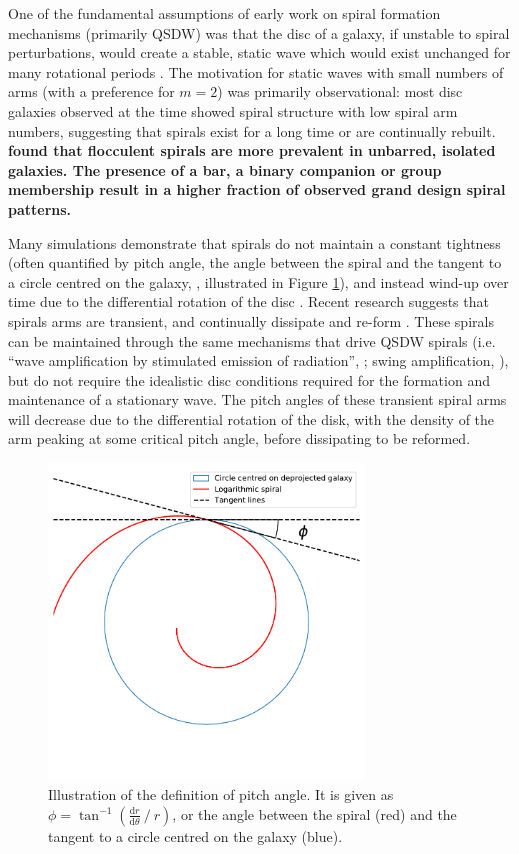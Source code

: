 One of the fundamental assumptions of early work on spiral formation mechanisms (primarily QSDW) was that the disc of a galaxy, if unstable to spiral perturbations, would create a stable, static wave which would exist unchanged for many rotational periods \citep{1964ApJ...140..646L}. The motivation for static waves with small numbers of arms (with a preference for $m=2$) was primarily observational: most disc galaxies observed at the time showed spiral structure with low spiral arm numbers, suggesting that spirals exist for a long time or are continually rebuilt.
\textbf{\citep{1982MNRAS.201.1021E} found that flocculent spirals are more prevalent in unbarred, isolated galaxies. The presence of a bar, a binary companion or group membership result in a higher fraction of observed grand design spiral patterns.}

Many simulations demonstrate that spirals do not maintain a constant tightness (often quantified by pitch angle, the angle between the spiral and the tangent to a circle centred on the galaxy, \citealt{1987gady.book.....B}, illustrated in Figure \ref{fig:pitch-angle-example}), and instead wind-up over time due to the differential rotation of the disc \citep{2013ApJ...763...46B}. Recent research suggests that spirals arms are transient, and continually dissipate and re-form \citep{2014PASA...31...35D}. These spirals can be maintained through the same mechanisms that drive QSDW spirals (i.e. ``wave amplification by stimulated emission of radiation'', \citealt{1976ApJ...205..363M}; swing amplification, \citealt{1965MNRAS.130..125G}), but do not require the idealistic disc conditions required for the formation and maintenance of a stationary wave. The pitch angles of these transient spiral arms will decrease due to the differential rotation of the disk, with the density of the arm peaking at some critical pitch angle, before dissipating to be reformed.

\begin{figure}
  \includegraphics[width=8.4cm]{plots/pitch-angle-explanation.pdf}
  \caption{Illustration of the definition of pitch angle. It is given as $\phi = \tan^{-1}\left(\frac{\mathrm{d}r}{\mathrm{d}\theta}\ /\ r\right)$, or the angle between the spiral (red) and the tangent to a circle centred on the galaxy (blue).}
  \label{fig:pitch-angle-example}
\end{figure}

